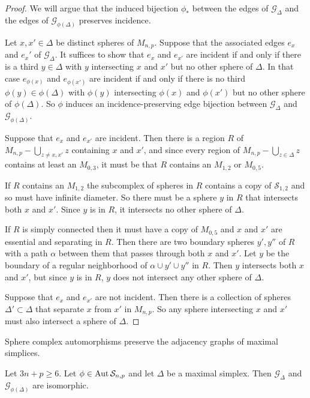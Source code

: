 \begin{proof}
  We will argue that the induced bijection  $\phi_\ast$
  between the edges of $\mathcal G_\Delta$ and the edges of $\mathcal G_{\phi(\Delta)}$ preserves incidence.

  Let $x,x' \in \Delta$ be distinct spheres of $M_{n,p}$.
  Suppose that the associated edges $e_x$ and $e_x'$
  of $\mathcal G_\Delta$.
  It suffices to show that $e_x$ and $e_{x'}$ are incident if and only if there is a third $y \in \Delta$ with $y$
  intersecting $x$ and $x'$ but no other sphere of $\Delta$.
  In that case $e_{\phi(x)}$ and $e_{\phi(x')}$ are incident if and only if there is no third $\phi(y) \in \phi(\Delta)$ with $\phi(y)$
  intersecting $\phi(x)$ and $\phi(x')$ but no other sphere of $\phi(\Delta)$.
  So $\phi$ induces an incidence-preserving edge bijection between $\mathcal G_\Delta$ and $\mathcal G_{\phi(\Delta)}$.

  Suppose that $e_x$ and $e_{x'}$ are incident.
  Then there is a region $R$ of $M_{n,p}-\bigcup_{z \neq x,x'}z$
  containing $x$ and $x'$, and since every region of
  $M_{n,p}-\bigcup_{z \in \Delta}z$ contains at least an $M_{0,3}$,
  it must be that $R$ contains an $M_{1,2}$ or $M_{0,5}$.

  If $R$ contains an $M_{1,2}$ the subcomplex of spheres in $R$ contains a copy of $\mathcal S_{1,2}$ and so must have infinite diameter. So there must be a sphere $y$ in $R$ that intersects both $x$ and $x'$. Since $y$ is in $R$, it intersects no other sphere of $\Delta$.

  If $R$ is simply connected then it must have a copy of $M_{0,5}$
  and $x$ and $x'$ are essential and separating in $R$.
  Then there are two boundary spheres $y',y''$ of $R$ with a path $\alpha$ between them that passes through both $x$ and $x'$. Let $y$ be the boundary of a regular neighborhood of $\alpha \cup y' \cup y''$ in $R$. Then $y$ intersects both $x$ and $x'$, but since $y$ is in $R$, $y$ does not intersect any other sphere of $\Delta$.

  Suppose that $e_x$ and $e_{x'}$ are not incident.
  Then there is a collection of spheres $\Delta' \subset \Delta$
  that separate $x$ from $x'$ in $M_{n,p}$.
  So any sphere intersecting $x$ and $x'$ must also intersect a sphere of $\Delta$.
\end{proof}



\begin{corollary}
  Sphere complex automorphisms preserve the adjacency graphs of maximal simplices.

  Let $3n+p\geq 6$.
  Let $\phi \in \operatorname{Aut} \mathcal S_{n,p}$ and let $\Delta$ be a maximal simplex. Then $\mathcal G_\Delta$ and $\mathcal G_{\phi(\Delta)}$ are isomorphic.
  \label{lemma:outadjgraph}
\end{corollary}

